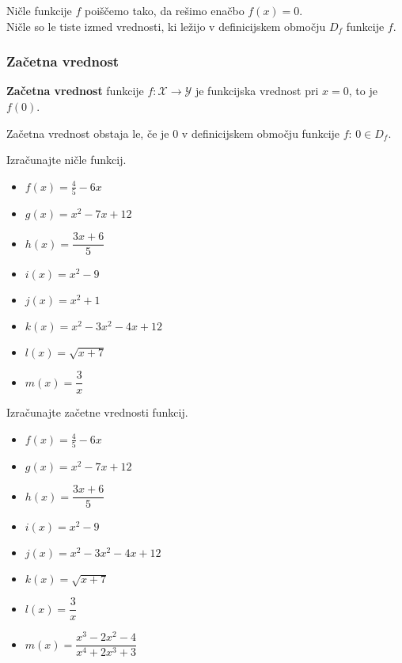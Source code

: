         Ničle funkcije $f$ poiščemo tako, da rešimo enačbo $f(x)=0$. \\
        Ničle so le tiste izmed vrednosti, ki ležijo v definicijskem območju $D_f$ funkcije $f$.

        
    \subsubsection*{Začetna vrednost}
        \textbf{Začetna vrednost} funkcije $f:\mathcal{X}\to\mathcal{Y}$ je funkcijska vrednost pri $x=0$, to je $f(0)$.

        Začetna vrednost obstaja le, če je $0$ v definicijskem območju funkcije $f$: $0\in D_f$.

        





    \begin{naloga}
        Izračunajte ničle funkcij.
            \begin{itemize}
                \item $f(x)=\frac{4}{5}-6x$ 
                \item $g(x)=x^2-7x+12$ 
                \item $h(x)=\dfrac{3x+6}{5}$ 
                \item $i(x)=x^2-9$ 
                \item $j(x)=x^2+1$ 
                \item $k(x)=x^2-3x^2-4x+12$ 
                \item $l(x)=\sqrt{x+7}$ 
                \item $m(x)=\dfrac{3}{x}$ 
            \end{itemize}

    \end{naloga}


    \begin{naloga}
        Izračunajte začetne vrednosti funkcij.
            \begin{itemize}
                \item $f(x)=\frac{4}{5}-6x$ 
                \item $g(x)=x^2-7x+12$ 
                \item $h(x)=\dfrac{3x+6}{5}$ 
                \item $i(x)=x^2-9$ 
                \item $j(x)=x^2-3x^2-4x+12$ 
                \item $k(x)=\sqrt{x+7}$ 
                \item $l(x)=\dfrac{3}{x}$ 
                \item $m(x)=\dfrac{x^3-2x^2-4}{x^4+2x^3+3}$ 
            \end{itemize}

    \end{naloga}





